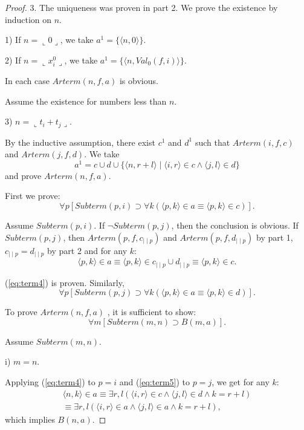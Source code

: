 \documentclass{asl}
\theoremstyle{definition}
\begin{document}
\begin{proof}
3. The uniqueness was proven in part 2. We prove the existence by induction on $n$.

1) If $n=\llcorner 0\lrcorner$, we take $a^1=\lbrace \langle n,0\rangle\rbrace$. 
\smallskip

2) If $n=\llcorner x_i^0\lrcorner$, we take $a^1=\lbrace \langle n,Val_0(f,i)\rangle\rbrace$.
\smallskip

In each case $Arterm(n,f,a)$ is obvious.

Assume the existence for numbers less than $n$. 

3) $n=\llcorner t_i+t_j\lrcorner$. 

By the inductive assumption, there exist $c^1$ and $d^1$ such that $Arterm(i,f,c)$ and $Arterm(j,f,d)$. We take 
\[a^1=c\cup d\cup\lbrace \langle n,r+l\rangle \mid  \langle i,r\rangle\in c\wedge \langle j,l\rangle\in d\rbrace\] 
and prove $Arterm(n,f,a)$.

First we prove:
\begin{equation}
\forall p\left[Subterm(p,i)\supset\forall k\left(
\langle p,k\rangle\in a\equiv\langle p,k\rangle\in c \right) \right].
\label{eq:term4}
\end{equation}

Assume $Subterm(p,i)$. If $\neg Subterm(p,j)$, then the conclusion is obvious. If $Subterm(p,j)$, then  $Arterm(p,f,c_{\mid\mid p})$ and $Arterm(p,f,d_{\mid\mid p})$ by part 1, $c_{\mid\mid p}=d_{\mid\mid p}$ by part 2 and for any $k$:
\[\langle p,k\rangle\in a\equiv\langle p,k\rangle\in c_{\mid\mid p}\cup d_{\mid\mid p}\equiv\langle p,k\rangle\in c.\]

(\ref{eq:term4}) is proven. Similarly,
\begin{equation}
\forall p\left[Subterm(p,j)\supset\forall k\left(
\langle p,k\rangle\in a\equiv\langle p,k\rangle\in d \right) \right].
\label{eq:term5}
\end{equation}

To prove $Arterm(n,f,a)$ , it is sufficient to show:
\begin{equation}
\forall m \left[Subterm(m,n)\supset B(m,a)\right].
\label{eq:term6}
\end{equation}

Assume $Subterm(m,n)$.

i) $m=n$.

Applying (\ref{eq:term4}) to $p=i$ and (\ref{eq:term5}) to $p=j$, we get for any $k$:
\begin{multline*}
\langle n,k\rangle\in a
\equiv
\exists r,l
\left(\langle i,r\rangle\in c\wedge 
\langle j,l\rangle\in d
\wedge
k=r+l\right)
\\
\equiv
\exists r,l
\left(\langle i,r\rangle\in a\wedge 
\langle j,l\rangle\in a
\wedge
k=r+l\right),
\end{multline*}
which implies $B(n,a)$.


\end{proof}
\end{document}

